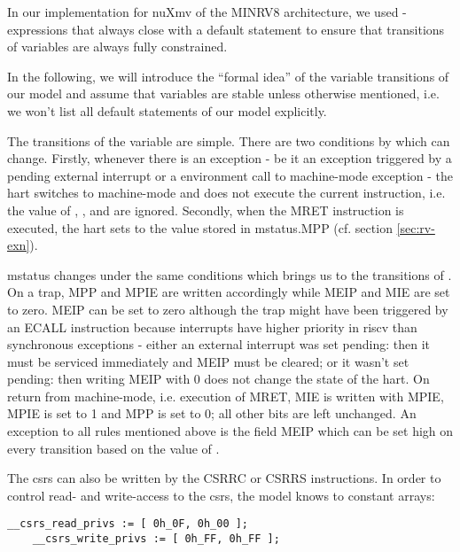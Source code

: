 In our implementation for nuXmv of the MINRV8 architecture, we used -expressions that always close with a default statement to ensure that transitions of variables are always fully constrained.

In the following, we will introduce the \enquote{formal idea} of the variable transitions of our model and assume that variables are stable unless otherwise mentioned, i.e. we won't list all default statements of our model explicitly.

The transitions of the  variable are simple.
There are two conditions by which  can change.
Firstly, whenever there is an exception - be it an exception triggered by a pending external interrupt or a environment call to machine-mode exception - the \gls{hart} switches to machine-mode and does not execute the current instruction, i.e. the value of , ,  and  are ignored.
Secondly, when the MRET instruction is executed, the \gls{hart} sets  to the value stored in \gls{mstatus}.MPP (cf. section \ref{sec:rv-exn}).

\gls{mstatus} changes under the same conditions which brings us to the transitions of .
On a trap, MPP and MPIE are written accordingly while MEIP and MIE are set to zero.
MEIP can be set to zero although the trap might have been triggered by an ECALL instruction because interrupts have higher priority in \gls{riscv} than synchronous exceptions - either an external interrupt was set pending: then it must be serviced immediately and MEIP must be cleared; or it wasn't set pending: then writing MEIP with 0 does not change the state of the \gls{hart}.
On return from machine-mode, i.e. execution of MRET, MIE is written with MPIE, MPIE is set to 1 and MPP is set to 0; all other bits are left unchanged.
An exception to all rules mentioned above is the field MEIP which can be set high on every transition based on the value of .

The \glspl{csr} can also be written by the CSRRC or CSRRS instructions.
In order to control read- and write-access to the \glspl{csr}, the model knows to constant arrays:
\begin{lstlisting}[language=smv]
    __csrs_read_privs := [ 0h_0F, 0h_00 ];
    __csrs_write_privs := [ 0h_FF, 0h_FF ];
\end{lstlisting}

